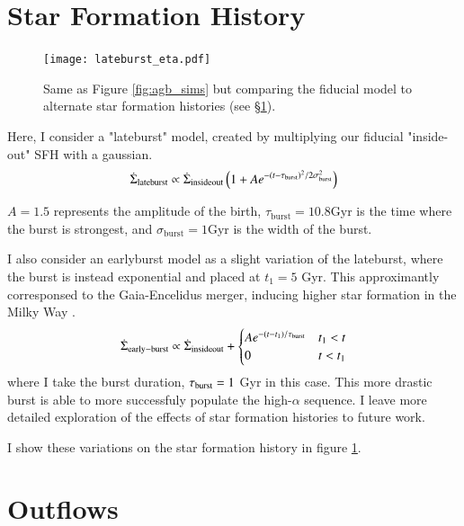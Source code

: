 \documentclass[12pt,oneside]{report}
\begin{document}
\section{Star Formation History} \label{sec:sfh}



\begin{figure}
\centering
\texttt{[image: lateburst\_eta.pdf]}

\caption[Lateburst models]{Same as Figure \ref{fig:agb_sims} but comparing the fiducial model to alternate star formation histories (see \S \ref{sec:sfh}).}
\label{fig:sfh_models}

\end{figure}


Here, I consider a "lateburst" model, created by multiplying our fiducial "inside-out" SFH with a gaussian.
\begin{equation}\label{eq:lateburst}
    \dot{\Sigma}_{\rm lateburst} \propto \dot{\Sigma}_{\rm insideout} \left(1 + A e^{-(t-\tau_{\rm burst})^2/2\sigma^2_{\rm burst}} \right)
\end{equation}

$A=1.5$ represents the amplitude of the birth, $\tau_\text{burst}=10.8$Gyr is the time where the burst is strongest, and $\sigma_\text{burst}=1$Gyr is the width of the burst.

I also consider an earlyburst model as a slight variation of the lateburst, where the burst is instead exponential and placed at $t_1=5$ Gyr. This approximantly corresponsed to the Gaia-Encelidus merger, inducing higher star formation in the Milky Way \citep{bonaca20, helmi18}.
\begin{equation}\label{eq:twoinfall}
    \dot{\Sigma}_{\rm early-burst} \propto \dot{\Sigma}_{\rm insideout} + 
\begin{cases}
    Ae^{-(t-t_1)/\tau_{\rm burst}} & t_1 < t \\
      0 & t<t_1
\end{cases}
\end{equation}
where I take the burst duration, $\tau_{\rm burst}=1$ Gyr in this case. 
This more drastic burst is able to more successfuly populate the high-$\alpha$ sequence. I leave more detailed exploration of the effects of star formation histories to future work.

I show these variations on the star formation history in figure \ref{fig:sfh_models}.


\section{Outflows} \label{sec:outflows}
\end{document}
